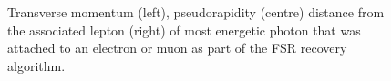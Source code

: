 \begin{figure}
%
%
\caption{Transverse momentum (left), pseudorapidity (centre) distance from the associated lepton (right)
of most energetic photon that was attached to an electron or muon as part of the FSR recovery algorithm.}
\label{fig:Run2_SR4P_fsrPhotons}
\end{figure}
